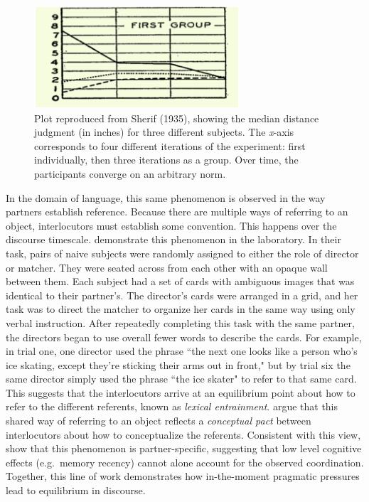 \documentclass[man, noapacite, 12pt]{apa2}
\begin{document}
\begin{figure}
\begin{center} 
\includegraphics[width=3in]{figs/coordinatingmeaning.png}
\caption{\label{fig:results}  Plot reproduced from Sherif (1935), showing the median distance judgment (in inches) for three different subjects. The {\it x}-axis corresponds to four different iterations of the experiment: first individually, then three iterations as a group. Over time, the participants converge on an arbitrary norm.}
\end{center} 
\end{figure}

In the domain of language, this same phenomenon is observed in the way partners establish reference. Because there are multiple ways of referring to an object, interlocutors must establish some convention. This happens over the discourse timescale.  demonstrate this phenomenon in the laboratory. In their task, pairs of naive subjects were randomly assigned to either the role of director or matcher. They were seated across from each other with an opaque wall  between them. Each subject had a set of cards with ambiguous images that was identical to their partner's. The director's cards were arranged in a grid, and her task was to direct the matcher to organize her cards in the same way using only verbal instruction. After repeatedly completing this task with the same partner, the directors began to use overall fewer words to describe the cards. For example, in trial one, one director used the phrase ``the next one looks like a person who's ice skating, except they're sticking their arms out in front," but by trial six the same director simply used the phrase ``the ice skater" to refer to that same card. This suggests that the interlocutors arrive at an equilibrium point about how to refer to the different referents, known as {\it lexical entrainment}.  argue that this shared way of referring to an object reflects a {\it conceptual pact} between interlocutors about how to conceptualize the referents. Consistent with this view,  show that this phenomenon is partner-specific, suggesting that low level cognitive effects (e.g.\ memory recency) cannot alone account for the observed coordination. Together, this line of work demonstrates how in-the-moment pragmatic pressures lead to equilibrium in discourse.
\end{document}
